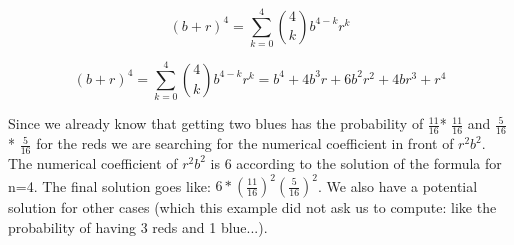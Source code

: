 \documentclass{article}
\begin{document}
\begin{equation*}
(b+r)^4 = \sum_{k=0}^{4} \binom{4}{k} b^{4-k} r^{k}
\end{equation*}

\begin{equation*}
(b+r)^4 = \sum_{k=0}^{4} \binom{4}{k} b^{4-k} r^{k} = b^4 + 4b^3r + 6b^2r^2 + 4br^3 + r^4
\end{equation*}

Since we already know that getting two blues has the probability of \(\frac{11}{16}\)* \(\frac{11}{16}\) and \(\frac{5}{16}\) * \(\frac{5}{16}\) for the reds we are searching for the numerical coefficient in front of \( r^2 b^2 \). The numerical coefficient of \( r^2 b^2 \) is 6 according to the solution of the formula for n=4. The final solution goes like: \(6* (\frac{11}{16})^2 (\frac{5}{16})^2 \). We also have a potential solution for other cases (which this example did not ask us to compute: like the probability of having 3 reds and 1 blue...).
\end{document}
